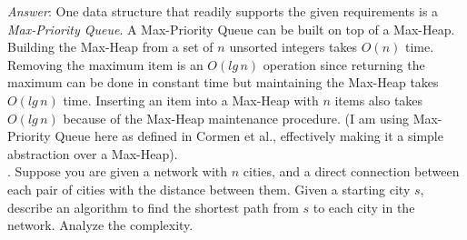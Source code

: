 \documentclass{scrartcl}
\begin{document}
    \noindent
    \textit{Answer}: One data structure that readily supports the given requirements is a
    \emph{Max-Priority Queue}. A Max-Priority Queue can be built on top of a Max-Heap. Building the
    Max-Heap from a set of $n$ unsorted integers takes $O(n)$ time. Removing the maximum item is an
    $O(lg\,n)$ operation since returning the maximum can be done in constant time but maintaining
    the Max-Heap takes $O(lg\,n)$ time. Inserting an item into a Max-Heap with $n$ items also takes
    $O(lg\,n)$ because of the Max-Heap maintenance procedure. (I am using Max-Priority Queue here as
    defined in Cormen et al., effectively making it a simple abstraction over a Max-Heap).\\

    \bigskip
    . Suppose you are given a network with $n$ cities, and a direct connection between each pair of
    cities with the distance between them. Given a starting city $s$, describe an algorithm to find
    the shortest path from $s$ to each city in the network. Analyze the complexity.\\
\end{document}

